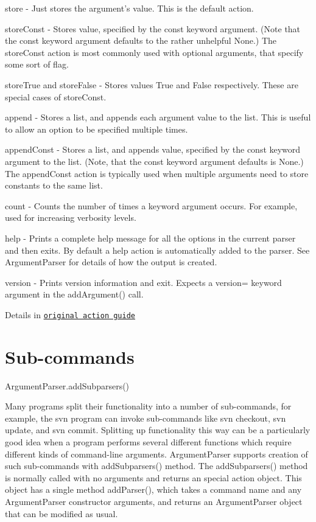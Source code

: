 \begin{DoxyItemize}
\item {\ttfamily store} -\/ Just stores the argument’s value. This is the default action.
\item {\ttfamily store\+Const} -\/ Stores value, specified by the const keyword argument. (Note that the const keyword argument defaults to the rather unhelpful None.) The \textquotesingle{}store\+Const\textquotesingle{} action is most commonly used with optional arguments, that specify some sort of flag.
\item {\ttfamily store\+True} and {\ttfamily store\+False} -\/ Stores values True and False respectively. These are special cases of \textquotesingle{}store\+Const\textquotesingle{}.
\item {\ttfamily append} -\/ Stores a list, and appends each argument value to the list. This is useful to allow an option to be specified multiple times.
\item {\ttfamily append\+Const} -\/ Stores a list, and appends value, specified by the const keyword argument to the list. (Note, that the const keyword argument defaults is None.) The \textquotesingle{}append\+Const\textquotesingle{} action is typically used when multiple arguments need to store constants to the same list.
\item {\ttfamily count} -\/ Counts the number of times a keyword argument occurs. For example, used for increasing verbosity levels.
\item {\ttfamily help} -\/ Prints a complete help message for all the options in the current parser and then exits. By default a help action is automatically added to the parser. See Argument\+Parser for details of how the output is created.
\item {\ttfamily version} -\/ Prints version information and exit. Expects a {\ttfamily version=} keyword argument in the add\+Argument() call.
\end{DoxyItemize}

Details in \href{http://docs.python.org/dev/library/argparse.html#action}{\tt original action guide}

\section*{Sub-\/commands }

Argument\+Parser.\+add\+Subparsers()

Many programs split their functionality into a number of sub-\/commands, for example, the svn program can invoke sub-\/commands like {\ttfamily svn checkout}, {\ttfamily svn update}, and {\ttfamily svn commit}. Splitting up functionality this way can be a particularly good idea when a program performs several different functions which require different kinds of command-\/line arguments. {\ttfamily Argument\+Parser} supports creation of such sub-\/commands with {\ttfamily add\+Subparsers()} method. The {\ttfamily add\+Subparsers()} method is normally called with no arguments and returns an special action object. This object has a single method {\ttfamily add\+Parser()}, which takes a command name and any {\ttfamily Argument\+Parser} constructor arguments, and returns an {\ttfamily Argument\+Parser} object that can be modified as usual.

